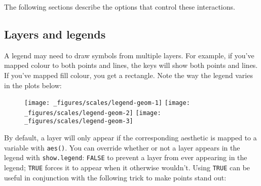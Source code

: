 The following sections describe the options that control these
interactions.

\hypertarget{sub-layers-legends}{%
\subsection{Layers and legends}\label{sub-layers-legends}}

A legend may need to draw symbols from multiple layers. For example, if
you've mapped colour to both points and lines, the keys will show both
points and lines. If you've mapped fill colour, you get a rectangle.
Note the way the legend varies in the plots below:

\begin{figure}[H]
  \texttt{[image: \_figures/scales/legend-geom-1]}%
  \texttt{[image: \_figures/scales/legend-geom-2]}%
  \texttt{[image: \_figures/scales/legend-geom-3]}
\end{figure}

By default, a layer will only appear if the corresponding aesthetic is
mapped to a variable with \texttt{aes()}. You can override whether or
not a layer appears in the legend with \texttt{show.legend}:
\texttt{FALSE} to prevent a layer from ever appearing in the legend;
\texttt{TRUE} forces it to appear when it otherwise wouldn't. Using
\texttt{TRUE} can be useful in conjunction with the following trick to
make points stand out:

\begin{Shaded}
\begin{Highlighting}[]
\OperatorTok{+}\StringTok{ }
\StringTok{  }\NormalTok{(} \NormalTok{, } \NormalTok{) }\OperatorTok{+}
\StringTok{  }\NormalTok{(}\NormalTok{(} \NormalTok{) }
\OperatorTok{+}\StringTok{ }
\StringTok{  }\NormalTok{(} \NormalTok{, } \NormalTok{, } \NormalTok{) }\OperatorTok{+}
\StringTok{  }\NormalTok{(}\NormalTok{(} \NormalTok{) }
\end{Highlighting}
\end{Shaded}


